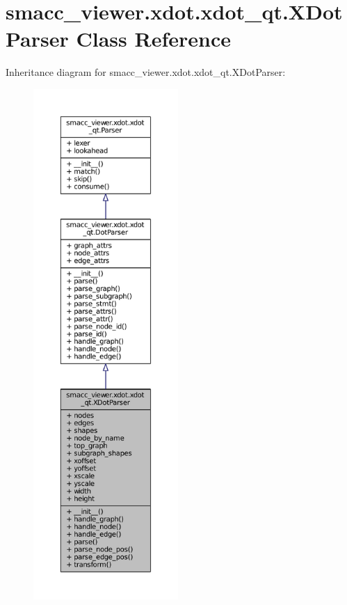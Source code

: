 \hypertarget{classsmacc__viewer_1_1xdot_1_1xdot__qt_1_1XDotParser}{}\section{smacc\+\_\+viewer.\+xdot.\+xdot\+\_\+qt.\+X\+Dot\+Parser Class Reference}
\label{classsmacc__viewer_1_1xdot_1_1xdot__qt_1_1XDotParser}


Inheritance diagram for smacc\+\_\+viewer.\+xdot.\+xdot\+\_\+qt.\+X\+Dot\+Parser\+:
\nopagebreak
\begin{figure}[H]
\begin{center}
\leavevmode
\includegraphics[height=550pt]{classsmacc__viewer_1_1xdot_1_1xdot__qt_1_1XDotParser__inherit__graph}
\end{center}
\end{figure}


